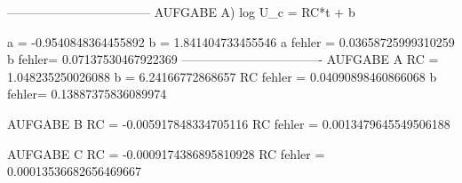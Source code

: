 -----------------------------------
AUFGABE A) 
log U_c = RC*t + b

a = -0.9540848364455892
b = 1.841404733455546
a fehler = 0.03658725999310259
b fehler= 0.07137530467922369
----------------------------------
AUFGABE A
RC = 1.048235250026088
b = 6.24166772868657
RC fehler = 0.04090898460866068
b fehler= 0.13887375836089974

AUFGABE B
RC = -0.005917848334705116
RC fehler = 0.0013479645549506188

AUFGABE C
RC = -0.0009174386895810928
RC fehler = 0.00013536682656469667


